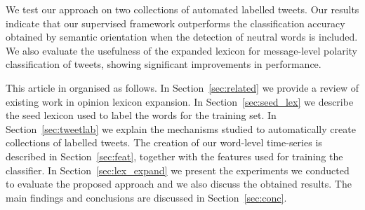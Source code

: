 \documentclass{sig-alternate}
\begin{document}



 
We test our approach on two collections of automated labelled tweets. Our results indicate that our supervised framework outperforms the classification accuracy obtained by  semantic orientation when the detection of neutral words is included. We also evaluate the usefulness of the expanded lexicon for message-level polarity classification of tweets, showing significant improvements in performance.   
 
This article in organised as follows. In Section~\ref{sec:related} we provide a review of existing work in opinion lexicon expansion. In Section~\ref{sec:seed_lex} we describe the seed lexicon used to label the words for the training set. In Section~\ref{sec:tweetlab} we explain the mechanisms studied to automatically create collections of labelled tweets.
 The creation of our word-level time-series is described in Section~\ref{sec:feat}, together with the features used for training the classifier. In Section~\ref{sec:lex_expand} we present the experiments we conducted to evaluate the proposed approach and we also discuss the obtained results. The main findings and conclusions are discussed in Section~\ref{sec:conc}.
\end{document}
